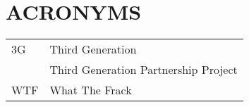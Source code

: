 \pagestyle{plain}
\appendix
\section*{ACRONYMS}
\label{appendix:acronyms}
\vspace*{1cm}

\begin{longtable}{l|l}
3G&Third Generation\\
&Third Generation Partnership Project\\
WTF&What The Frack\\
\end{longtable}

